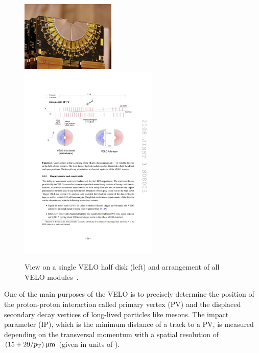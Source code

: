 \begin{figure}[htb]
\includegraphics[width=0.4\textwidth]{04-Detector/figs/VELO.jpg}
\includegraphics[width=0.59\textwidth]{04-Detector/figs/AnordnungVELOStationen.pdf}
\caption{View on a single VELO half disk (left) and arrangement of all VELO
modules~\cite{Alves:2008zz}.}
\label{fig:detector:velo}
\end{figure}
One of the main purposes of the VELO is to precisely determine the position of
the proton-proton interaction called primary vertex (PV) and the displaced
secondary decay vertices of long-lived particles like \Bd mesons. The impact
parameter (IP), which is the minimum distance of a track to a PV, is measured
depending on the transversal momentum \pT with a spatial resolution of
$(15+29/\mbox{$p_{\mathrm{ T}}$}){\,\upmu\mathrm{m}}$ (\pT given in units of \si{\gevc}).

